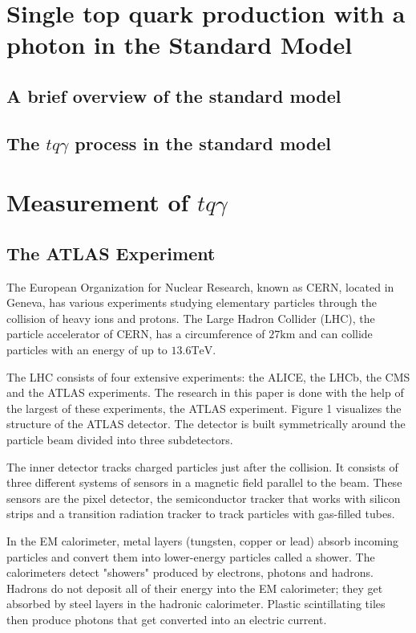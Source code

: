 \chapter{Single top quark production with a photon in the Standard Model}
\section{A brief overview of the standard model}
\section{The \texorpdfstring{$tq\gamma$}{tqGamma} process in the standard model}


\chapter{Measurement of \texorpdfstring{$tq\gamma$}{tqGamma}}



\section{The ATLAS Experiment}

The European Organization for Nuclear Research, known as CERN, located in Geneva, has various experiments studying elementary particles through the collision of heavy ions and protons. 
The Large Hadron Collider (LHC), the particle accelerator of CERN, has a circumference of $27 \si{\kilo\metre}$ and can collide particles with an energy of up to $13.6 \si{\tera\electronvolt}$. 


The LHC consists of four extensive experiments: the ALICE, the LHCb, the CMS and the ATLAS experiments. The research in this paper is done with the help of the largest of these experiments, the ATLAS experiment. Figure 1 visualizes the structure of the ATLAS detector.  The detector is built symmetrically around the particle beam divided into three subdetectors.

The inner detector tracks charged particles just after the collision. It consists of three different systems of sensors in a magnetic field parallel to the beam. These sensors are the pixel detector, the semiconductor tracker that works with silicon strips and a transition radiation tracker to track particles with gas-filled tubes. 

In the EM calorimeter, metal layers (tungsten, copper or lead) absorb incoming particles and convert them into lower-energy particles called a shower. The calorimeters detect "showers" produced by electrons, photons and hadrons. 
Hadrons do not deposit all of their energy into the EM calorimeter; they get absorbed by steel layers in the hadronic calorimeter. 
Plastic scintillating tiles then produce photons that get converted into an electric current. 

